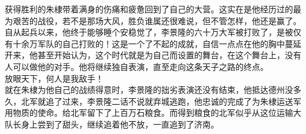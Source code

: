 \begin{multicols}{\theparacolNo}
获得胜利的朱棣带着满身的伤痛和疲惫回到了自己的大营。这实在是他经历过的最为艰苦的战役，若不是那场大风，胜负谁属还很难说，但不管怎样，他还是赢了。\\

自从起兵以来，他终于能够睡个安稳觉了，李景隆的六十万大军被打败了，是被仅有十余万军队的自己打败的！这是一个了不起的成就，自信一点点在他的胸中蔓延开来，他甚至开始认为，这个时代就是为自己而设置的舞台，在这个舞台上，没有人可以做他的对手。他将继续独自表演，直至走向这条天子之路的终点。\\

放眼天下，何人是我敌手！\\

就在朱棣为他自己的战绩得意时，李景隆的拙劣表演还没有结束，他抵达德州没多久，北军就追了过来，李景隆二话不说就弃城逃跑，他忠诚的完成了为朱棣运送军用物质的使命。给北军留下了上百万石粮食。而得到粮食的北军似乎从这位运输大队长身上尝到了甜头，继续追着他不放，一直追到了济南。\\
\ifnum{}
	\end{multicols}
\fi
\newpage
